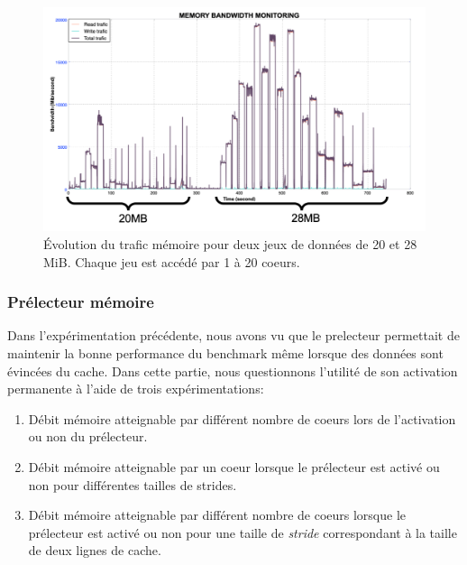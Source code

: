         \begin{figure}
        \center
        \includegraphics[width=14cm]{images/dml_bw_cacheL3.png}
        \caption{\label{pic:dml_bw_cacheL3} Évolution du trafic mémoire pour deux jeux de données de 20 et 28 MiB. Chaque jeu est accédé par 1 à 20 coeurs.}
        \end{figure}
        
        

    \subsubsection{Prélecteur mémoire}
        
        Dans l'expérimentation précédente, nous avons vu que le \gls{prelecteur} permettait de maintenir la bonne performance du benchmark même lorsque des données sont évincées du cache. Dans cette partie, nous questionnons l'utilité de son activation permanente à l'aide de trois expérimentations:
        \begin{enumerate}
            \item Débit mémoire atteignable par différent nombre de coeurs lors de l'activation ou non du prélecteur.
            \item Débit mémoire atteignable par un coeur lorsque le prélecteur est activé ou non pour différentes tailles de \glspl{stride}.
            \item Débit mémoire atteignable par différent nombre de coeurs lorsque le prélecteur est activé ou non pour une taille de \textit{stride} correspondant à la taille de deux lignes de cache.
        \end{enumerate}

        
